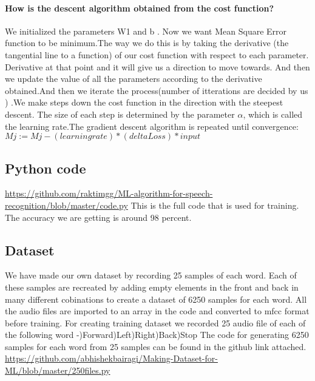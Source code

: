 \documentclass[a4paper,12pt]{article}
\begin{document}
\paragraph{How is the descent algorithm obtained from the cost function?\newline}
We initialized the parameters W1 and b . Now we want Mean Square Error function to 
be minimum.The way we do this is by taking the derivative (the tangential line to a 
function) of our cost function with respect to each parameter. Derivative at that 
point and it will give us a direction to move towards. And then we update the value 
of all the parameters according to the derivative obtained.And then we iterate the 
process(number of itterations are decided by us ) .We make steps down the cost 
function in the direction with the steepest descent. The size of each step is 
determined by the parameter $\alpha$, which is called the learning rate.The gradient 
descent algorithm is repeated until convergence: 
$Mj :=Mj-(learningrate)*(delta Loss)*input$


\subsection{Python code}

\url{https://github.com/raktimgg/ML-algorithm-for-speech-recognition/blob/master/code.py}\newline
This is the full code that is used for training. The accuracy we are getting is around 98 percent.

\subsection{Dataset}
We have made our own dataset by recording 25 samples of each word. Each of these samples are recreated by adding empty elements in the front and back in many different cobinations to create a dataset of 6250 samples for each word. All the audio files are imported to an array in the code and converted to mfcc format before training. For creating training dataset we recorded 25 audio file of each of the following word -)Forward)Left)Right)Back)Stop\newline
The code for generating 6250 samples for each word from 25 samples can be found in the github link attached.\newline
\url{https://github.com/abhishekbairagi/Making-Dataset-for-ML/blob/master/250files.py}
\end{document}
